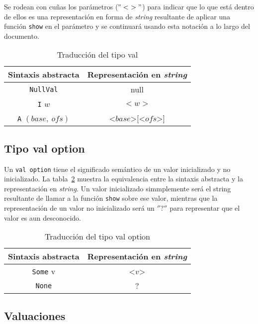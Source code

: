 Se rodean con cuñas los parámetros ($"<\ >"$) para indicar que lo que está dentro de ellos es una representación en forma de \textit{string} resultante de aplicar una función \verb|show| en el parámetro y se continuará usando esta notación a lo largo del documento.

\begin{table}[h!]
\centering
\begin{tabular}{|c|c|}
  \hline
  \textbf{Sintaxis abstracta} & \textbf{Representación en \textit{string}} \\ [0.5ex]
  \hline \hline
  \verb|NullVal| & null \\
  \verb|I| $w$ & $<w>$ \\
  \verb|A| $(base,\ ofs)$ & <$base$>[<$ofs$>] \\
  \hline
\end{tabular}

\caption{Traducción del tipo val}
\label{tab:pretty_val}
\end{table}

\subsection{Tipo val option}\label{subsection:pretty_val_option_type}

Un \verb|val option| tiene el significado semántico de un valor inicializado y no inicializado.
La tabla~\ref{tab:pretty_val_option} muestra la equivalencia entre la sintaxis abstracta y la representación en \textit{string}.
Un valor inicializado simmplemente será el string resultante de llamar a la función \verb|show| sobre ese valor, mientras que la representación de un valor no inicializado será un $''?''$ para representar que el valor es aun desconocido.

\begin{table}[h!]
\centering
\begin{tabular}{|c|c|}
  \hline
  \textbf{Sintaxis abstracta} & \textbf{Representación en \textit{string}} \\ [0.5ex]
  \hline \hline
  \verb|Some| v & <$v$> \\
  \verb|None| & ? \\
  \hline
\end{tabular}

\caption{Traducción del tipo val option}
\label{tab:pretty_val_option}
\end{table}


\subsection{Valuaciones}\label{subsection:pretty_valuations}

